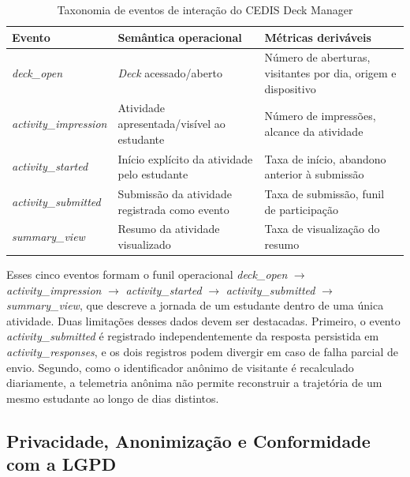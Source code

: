 \begin{table}[htb]
\caption{Taxonomia de eventos de interação do CEDIS Deck Manager}
\label{tab:eventos-deck-manager}
\centering
\begin{tabularx}{\textwidth}{l>{\raggedright\arraybackslash}X>{\raggedright\arraybackslash}X}
\hline
\textbf{Evento} & \textbf{Semântica operacional} & \textbf{Métricas deriváveis} \\
\hline
\textit{deck\_open} & \textit{Deck} acessado/aberto & Número de aberturas, visitantes por dia, origem e dispositivo \\
\hline
\textit{activity\_impression} & Atividade apresentada/visível ao estudante & Número de impressões, alcance da atividade \\
\hline
\textit{activity\_started} & Início explícito da atividade pelo estudante & Taxa de início, abandono anterior à submissão \\
\hline
\textit{activity\_submitted} & Submissão da atividade registrada como evento & Taxa de submissão, funil de participação \\
\hline
\textit{summary\_view} & Resumo da atividade visualizado & Taxa de visualização do resumo \\
\hline
\end{tabularx}
\end{table}

Esses cinco eventos formam o funil operacional \textit{deck\_open}
$\rightarrow$ \textit{activity\_impression} $\rightarrow$
\textit{activity\_started} $\rightarrow$ \textit{activity\_submitted}
$\rightarrow$ \textit{summary\_view}, que descreve a jornada de um estudante
dentro de uma única atividade. Duas limitações desses dados devem
ser destacadas. Primeiro, o evento \textit{activity\_submitted} é
registrado independentemente da resposta persistida em
\textit{activity\_responses}, e os dois registros podem divergir em caso
de falha parcial de envio. Segundo, como o identificador anônimo de
visitante é recalculado diariamente, a telemetria anônima não permite
reconstruir a trajetória de um mesmo estudante ao longo de dias distintos.

\subsection{Privacidade, Anonimização e Conformidade com a LGPD}
\label{subsec:privacidade}

